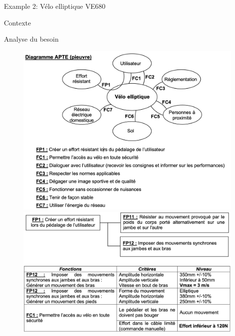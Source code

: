 \documentclass[
  ignorenonframetext,
  aspectratio=169,
  c]{beamer}
\begin{document}
\begin{frame}{Example 2: Vélo elliptique VE680}
\begin{block}{Contexte}
\begin{figure}
\end{figure}%
\end{block}

\begin{block}{Analyse du besoin}
\begin{figure}

\begin{minipage}{0.50\linewidth}
\begin{center}
\includegraphics[width=1\textwidth,height=\textheight]{CM3/Velo-fonctionnelle-01.png}
\end{center}
\end{minipage}%
%
\begin{minipage}{0.50\linewidth}
\begin{center}
\includegraphics[width=1\textwidth,height=\textheight]{CM3/Velo-fonctionnelle-03.png}
\end{center}
\end{minipage}%


\end{figure}
\end{block}
\end{frame}
\end{document}
